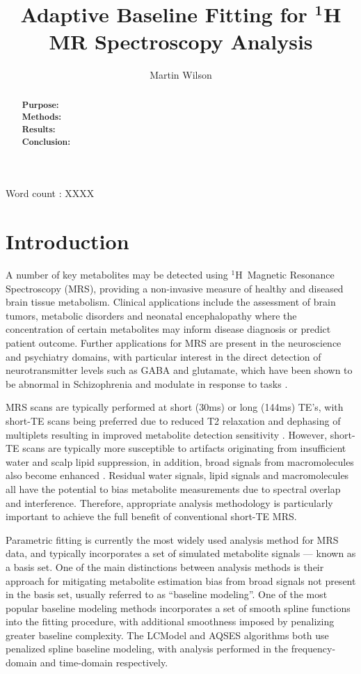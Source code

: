 \documentclass[num-refs]{wiley-article}
\title{Adaptive Baseline Fitting for $^{\textbf{1}}$H MR Spectroscopy Analysis}
\author[1]{Martin Wilson}
\affil[1]{Centre for Human Brain Health and School of Psychology, University of Birmingham, Birmingham, UK.}
\newcommand{\proton}{\ensuremath{^1\mathrm{H}}}
\begin{document}
\maketitle

\begin{abstract}
\textbf{Purpose:} \\
\textbf{Methods:} \\
\textbf{Results:} \\
\textbf{Conclusion:} 
\end{abstract}

Word count : XXXX


\section{Introduction}
A number of key metabolites may be detected using \proton\ Magnetic Resonance Spectroscopy (MRS), providing a non-invasive measure of healthy and diseased brain tissue metabolism. Clinical applications include the assessment of brain tumors, metabolic disorders and neonatal encephalopathy \cite{Oz2014,Lally2019} where the concentration of certain metabolites may inform disease diagnosis or predict patient outcome. Further applications for MRS are present in the neuroscience and psychiatry domains, with particular interest in the direct detection of neurotransmitter levels such as GABA and glutamate, which have been shown to be abnormal in Schizophrenia \cite{Merritt2016} and modulate in response to tasks \cite{Jelen2018,Chen2017}.

MRS scans are typically performed at short (30ms) or long (144ms) TE's, with short-TE scans being preferred due to reduced T2 relaxation and dephasing of multiplets resulting in improved metabolite detection sensitivity \cite{Wilson2019}. However, short-TE scans are typically more susceptible to artifacts originating from insufficient water and scalp lipid suppression, in addition, broad signals from macromolecules also become enhanced \cite{Cudalbu2012}. Residual water signals, lipid signals and macromolecules all have the potential to bias metabolite measurements due to spectral overlap and interference. Therefore, appropriate analysis methodology is particularly important to achieve the full benefit of conventional short-TE MRS.

Parametric fitting is currently the most widely used analysis method for MRS data, and typically incorporates a set of simulated metabolite signals --- known as a basis set. One of the main distinctions between analysis methods is their approach for mitigating metabolite estimation bias from broad signals not present in the basis set, usually referred to as ``baseline modeling''. One of the most popular baseline modeling methods incorporates a set of smooth spline functions into the fitting procedure, with additional smoothness imposed by penalizing greater baseline complexity. The LCModel \cite{Provencher1993} and AQSES \cite{Poullet2007} algorithms both use penalized spline baseline modeling, with analysis performed in the frequency-domain and time-domain respectively.
\end{document}
